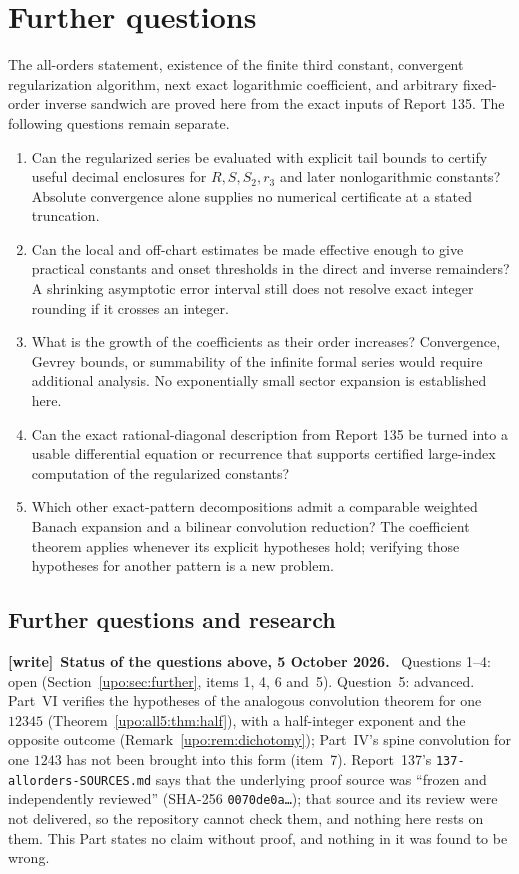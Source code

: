 \documentclass[11pt,letterpaper]{article}
\theoremstyle{remark}\newtheorem{remark}[theorem]{Remark}
\numberwithin{equation}{section}
\newcommand{\file}[1]{\nolinkurl{#1}}
\newenvironment{writenote}[1][]{\par\smallskip\begingroup\small
 \noindent\textbf{[write]}\if\relax\detokenize{#1}\relax\else~\textbf{#1.}\fi\ }%
 {\par\endgroup\smallskip}
\begin{document}
\section{Further questions}\label{upo:all:sec:questions}
The all-orders statement, existence of the finite third constant,
convergent regularization algorithm, next exact logarithmic coefficient,
and arbitrary fixed-order inverse sandwich are proved here from the
exact inputs of Report 135. The following questions remain separate.
\begin{enumerate}
\item Can the regularized series be evaluated with explicit tail bounds
to certify useful decimal enclosures for $R,S,S_2,r_3$ and later
nonlogarithmic constants? Absolute convergence alone supplies no
numerical certificate at a stated truncation.
\item Can the local and off-chart estimates be made effective enough
to give practical constants and onset thresholds in the direct and
inverse remainders? A shrinking asymptotic error interval still does
not resolve exact integer rounding if it crosses an integer.
\item What is the growth of the coefficients as their order increases?
Convergence, Gevrey bounds, or summability of the infinite formal series
would require additional analysis. No exponentially small sector
expansion is established here.
\item Can the exact rational-diagonal description from Report 135 be
turned into a usable differential equation or recurrence that supports
certified large-index computation of the regularized constants?
\item Which other exact-pattern decompositions admit a comparable
weighted Banach expansion and a bilinear convolution reduction? The
coefficient theorem applies whenever its explicit hypotheses hold;
verifying those hypotheses for another pattern is a new problem.
\end{enumerate}
\subsection{Further questions and research}\label{upo:all:sub:further}
\begin{writenote}[Status of the questions above, 5 October 2026]
Questions 1--4: open (Section~\ref{upo:sec:further}, items 1, 4, 6 and~5). Question~5: advanced. Part~VI verifies the hypotheses of the analogous convolution theorem for one $12345$ (Theorem~\ref{upo:all5:thm:half}), with a half-integer exponent and the opposite outcome (Remark~\ref{upo:rem:dichotomy}); Part~IV's spine convolution for one $1243$ has not been brought into this form (item~7). Report~137's \file{137-allorders-SOURCES.md} says that the underlying proof source was ``frozen and independently reviewed'' (SHA-256 \texttt{0070de0a\ldots}); that source and its review were not delivered, so the repository cannot check them, and nothing here rests on them. This Part states no claim without proof, and nothing in it was found to be wrong.
\end{writenote}
\end{document}
